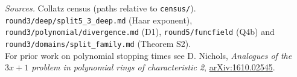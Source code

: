 \documentclass[11pt,a4paper]{article}
\begin{document}
\smallskip\noindent\small\raggedright
\emph{Sources.} Collatz census (paths relative to \texttt{census/}).\\
\texttt{round3/deep/split5\_3\_deep.md} (Haar exponent),
\texttt{round3/polynomial/divergence.md} (D1), \texttt{round5/funcfield} (Q4b) and
\texttt{round3/domains/split\_family.md} (Theorem S2).\\
For prior work on polynomial stopping times see D. Nichols, \emph{Analogues of the $3x+1$ problem in polynomial rings of characteristic 2}, \href{https://arxiv.org/abs/1610.02545}{arXiv:1610.02545}.
\end{document}
